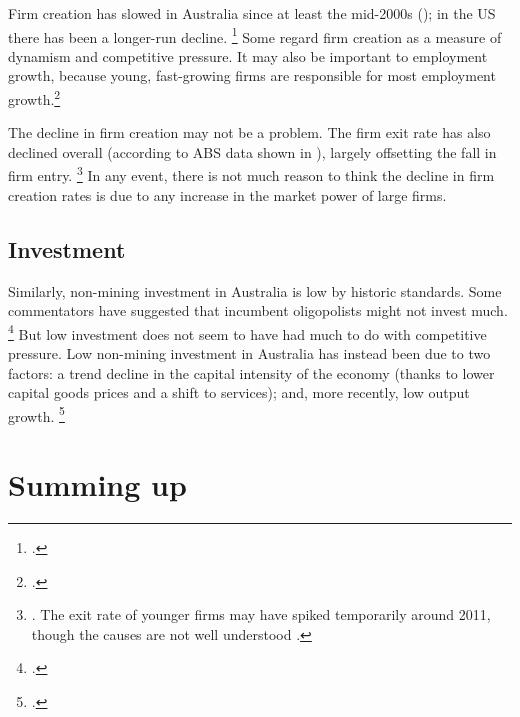 Firm creation has slowed in Australia since at least the mid-2000s (); in the US there has been a longer-run decline.%
\footcites{CEAcompetitionbriefmay2016, Furman_preso_2016} 
Some regard firm creation as a measure of dynamism and competitive pressure. It may also be important to employment growth, because young, fast-growing firms are responsible for most employment growth.\footcite{Industry_2015}

The decline in firm creation may not be a problem. The firm exit rate has also declined overall (according to ABS data shown in ), largely offsetting the fall in firm entry.%
    \footnote{\textcites{Breunig_2007}{IllusionsEntrepreneur2010}.
The exit rate of younger firms may have spiked temporarily around 2011, though the causes are not well understood \parencite{Bakhtiari_2017}.}
In any event, there is not much reason to think the decline in firm creation rates is due to any increase in the market power of large firms. 


\subsection{Investment}

Similarly, non-mining investment in Australia is low by historic standards. Some commentators have suggested that incumbent oligopolists might not invest much.%
    \footcite{Econ_probprofits2016} 
But low investment does not seem to have had much to do with competitive pressure. Low non-mining investment in Australia has instead been due to two factors: a trend decline in the capital intensity of the economy (thanks to lower capital goods prices and a shift to services); and, more recently, low output growth.%
    \footcite{MinifieChisholmPercival2017} 

\section{Summing up}

